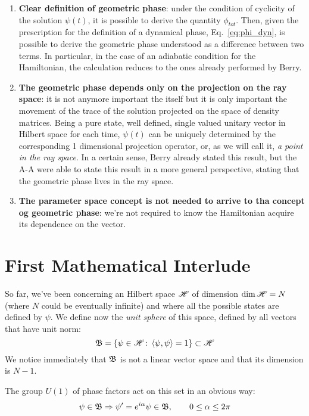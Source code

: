 \begin{enumerate}
	\item \textbf{Clear definition of geometric phase}: under the condition of cyclicity of the solution $ \psi(t) $, it is possible to derive the quantity $ \phi_{tot} $. Then, given the prescription for the definition of a dynamical phase, Eq.~\eqref{eq:phi_dyn}, is possible to derive the geometric phase understood as a difference between two terms.
	In particular, in the case of an adiabatic condition for the Hamiltonian, the calculation reduces to the ones already performed by Berry.
	\item \textbf{The geometric phase depends only on the projection on the ray space}: it is not anymore important the \wf itself but it is only important the movement of the trace of the solution projected on the space of density matrices. Being a pure state, well defined, single valued unitary vector in Hilbert space for each time, $ \psi(t) $ can be uniquely determined by the corresponding 1 dimensional projection operator, or, as we will call it, \emph{a point in the ray space}. In a certain sense, Berry already stated this result, but the A-A were able to state this result in a more general perspective, stating that the geometric phase lives in the ray space.
	\item \textbf{The parameter space concept is not needed to arrive to tha concept og geometric phase}: we're not required to know the Hamiltonian acquire its dependence on the \rp vector. 
\end{enumerate}

\section{First Mathematical Interlude}
So far, we've been concerning an Hilbert space $ \mathscr{H} $ of dimension $ \dim\mathscr{H}=N $ (where $ N $ could be eventually infinite) and where all the possible states are defined by $ \psi $. We define now the \textit{unit sphere} of this space, defined by all vectors that have unit norm:
\begin{equation}
\mathfrak{B}=\left\{\psi\in\mathscr{H}\colon \Braket{\psi,\psi}=1\right\}\subset\mathscr{H}
\end{equation}
We notice immediately that $ \mathfrak{B} $ is not a linear vector space and that its dimension is $ N-1 $. 

The group $ U(1) $ of phase factors act on this set in an obvious way:
\begin{equation}
\psi\in\mathfrak{B}\Rightarrow \psi'=e^{i\alpha}\psi\in\mathfrak{B},\qquad 0\leq\alpha\leq 2\pi
\end{equation} 

